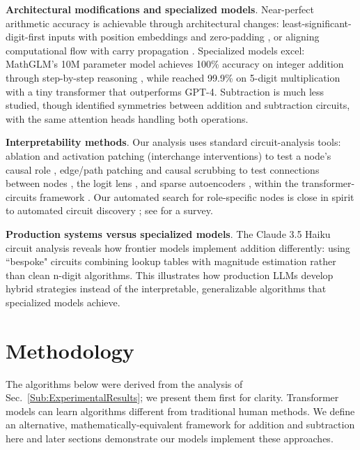 \documentclass[11pt]{article}
\begin{document}
\textbf{Architectural modifications and specialized models}. Near-perfect arithmetic accuracy is achievable through architectural
changes: least-significant-digit-first inputs with position embeddings and zero-padding
\citep{mcleish2024transformersarithmeticrightembeddings}, or aligning computational flow with carry propagation
\citep{cho2024positioncouplingimprovinglength}. Specialized models excel: MathGLM's 10M parameter model achieves 100\% accuracy on
integer addition through step-by-step reasoning \citep{yang2023gptsolvemathematicalproblems}, while
\citet{qiu2024dissectingmultiplicationtransformersinsights} reached 99.9\% on 5-digit multiplication with a tiny transformer that
outperforms GPT-4. Subtraction is much less studied, though \cite{zhang2024interpretingimprovinglargelanguage} identified symmetries between
addition and subtraction circuits, with the same attention heads handling both operations.

\textbf{Interpretability methods}. Our analysis uses standard circuit-analysis tools: ablation and activation patching (interchange
interventions) to test a node's causal role \citep{FactualAssociations,GoldowskyDill2023LocalizingMB}, edge/path patching and causal
scrubbing to test connections between nodes \citep{causalscrubbing2023}, the logit lens \citep{logitlens2020}, and sparse autoencoders
\citep{cunningham2023sparse}, within the transformer-circuits framework \citep{elhage2021mathematical}. Our automated search for
role-specific nodes is close in spirit to automated circuit discovery \citep{Conmy2023TowardsAC}; see \citet{bereska2024mechanistic} for a
survey.

\textbf{Production systems versus specialized models}. The Claude 3.5 Haiku circuit analysis \cite{lindsey2025biology} reveals how frontier
models implement addition differently: using ``bespoke" circuits combining lookup tables with magnitude estimation rather than clean n-digit
algorithms. This illustrates how production LLMs develop hybrid strategies instead of the interpretable, generalizable algorithms that
specialized models achieve.

\section{Methodology}
The algorithms below were derived from the analysis of Sec.~\ref{Sub:ExperimentalResults}; we present them first for clarity. Transformer
models can learn algorithms different from traditional human methods. We define an alternative, mathematically-equivalent framework for
addition and subtraction here and later sections demonstrate our models implement these approaches.
\end{document}
